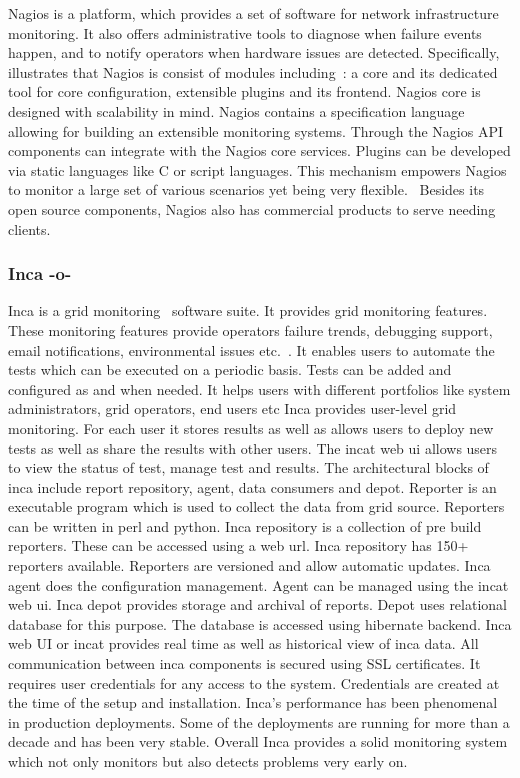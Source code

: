 Nagios is a platform, which provides a set of software for network
infrastructure monitoring. It also offers administrative tools to
diagnose when failure events happen, and to notify operators when
hardware issues are detected. Specifically, illustrates that Nagios is
consist of modules including~\cite{nagios-book}: a core and its
dedicated tool for core configuration, extensible plugins and its
frontend. Nagios core is designed with scalability in mind.  Nagios
contains a specification language allowing for building an extensible
monitoring systems.  Through the Nagios API components can integrate
with the Nagios core services. Plugins can be developed via static
languages like C or script languages. This mechanism empowers Nagios
to monitor a large set of various scenarios yet being very
flexible.~\cite{nagios-paper-2012} Besides its open source components,
Nagios also has commercial products to serve needing clients.


\subsubsection{Inca -o-}

Inca is a grid monitoring~\cite{inca-book} software suite. It provides
grid monitoring features. These monitoring features provide operators
failure trends, debugging support, email notifications, environmental
issues etc.~\cite{www-inca}. It enables users to automate the tests
which can be executed on a periodic basis. Tests can be added and
configured as and when needed. It helps users with different
portfolios like system administrators, grid operators, end users etc
Inca provides user-level grid monitoring. For each user it stores
results as well as allows users to deploy new tests as well as share
the results with other users. The incat web ui allows users to view
the status of test, manage test and results. The architectural blocks
of inca include report repository, agent, data consumers and
depot. Reporter is an executable program which is used to collect the
data from grid source. Reporters can be written in perl and
python. Inca repository is a collection of pre build reporters.  These
can be accessed using a web url. Inca repository has 150+ reporters
available. Reporters are versioned and allow automatic updates. Inca
agent does the configuration management. Agent can be managed using
the incat web ui. Inca depot provides storage and archival of
reports. Depot uses relational database for this purpose. The database
is accessed using hibernate backend.  Inca web UI or incat provides
real time as well as historical view of inca data.  All communication
between inca components is secured using SSL certificates. It requires
user credentials for any access to the system. Credentials are created
at the time of the setup and installation. Inca's performance has been
phenomenal in production deployments. Some of the deployments are
running for more than a decade and has been very stable. Overall Inca
provides a solid monitoring system which not only monitors but also
detects problems very early on.


